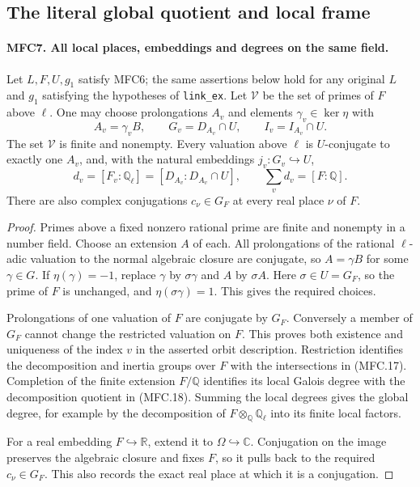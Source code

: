 \documentclass[11pt,a4paper]{article}
\numberwithin{equation}{section}
\theoremstyle{remark}\newtheorem{remark}[theorem]{Remark}
\begin{document}
\subsection{The literal global quotient and local frame}

\paragraph{MFC7. All local places, embeddings and degrees on the same field.}
\label{claim:MFC7}
Let \(L,F,U,g_1\) satisfy MFC6; the same assertions below hold
for any original \(L\) and \(g_1\) satisfying the hypotheses
of \texttt{link\_\allowbreak ex}.  Let \(\mathcal V\) be the set of primes
of \(F\) above \(\ell\).  One may choose prolongations
\(A_v\) and elements \(\gamma_v\in\ker\eta\) with
\[
 A_v=\gamma_v B,\qquad
 G_v=D_{A_v}\cap U,\qquad I_v=I_{A_v}\cap U.              \tag{MFC.17}
\]
The set \(\mathcal V\) is finite and nonempty.  Every valuation
above \(\ell\) is \(U\)-conjugate to exactly one \(A_v\),
and, with the natural embeddings \(j_v:G_v\hookrightarrow U\),
\[
 d_v=[F_v:\mathbb Q_\ell]=[D_{A_v}:D_{A_v}\cap U],
 \qquad \sum_vd_v=[F:\mathbb Q].                           \tag{MFC.18}
\]
There are also complex conjugations \(c_\nu\in G_F\) at
every real place \(\nu\) of \(F\).

\begin{proof}
Primes above a fixed nonzero rational prime are finite and nonempty
in a number field.  Choose an extension \(A\) of each.  All
prolongations of the rational \(\ell\)-adic valuation to the
normal algebraic closure are conjugate, so \(A=\gamma B\)
for some \(\gamma\in G\).  If \(\eta(\gamma)=-1\), replace
\(\gamma\) by \(\sigma\gamma\) and \(A\) by \(\sigma A\).
Here \(\sigma\in U=G_F\), so the prime of \(F\) is unchanged,
and \(\eta(\sigma\gamma)=1\).  This gives the required choices.

Prolongations of one valuation of \(F\) are conjugate by \(G_F\).
Conversely a member of \(G_F\) cannot change the restricted
valuation on \(F\).  This proves both existence and uniqueness
of the index \(v\) in the asserted orbit description.  Restriction
identifies the decomposition and inertia groups over \(F\) with
the intersections in (MFC.17).  Completion of the finite extension
\(F/\mathbb Q\) identifies its local Galois degree with the
decomposition quotient in (MFC.18).  Summing the local degrees
gives the global degree, for example by the decomposition of
\(F\otimes_\mathbb Q\mathbb Q_\ell\) into its finite local
factors.

For a real embedding \(F\hookrightarrow\mathbb R\), extend
it to \(\Omega\hookrightarrow\mathbb C\).  Conjugation on
the image preserves the algebraic closure and fixes \(F\),
so it pulls back to the required \(c_\nu\in G_F\).  This
also records the exact real place at which it is a conjugation.
\end{proof}
\end{document}
